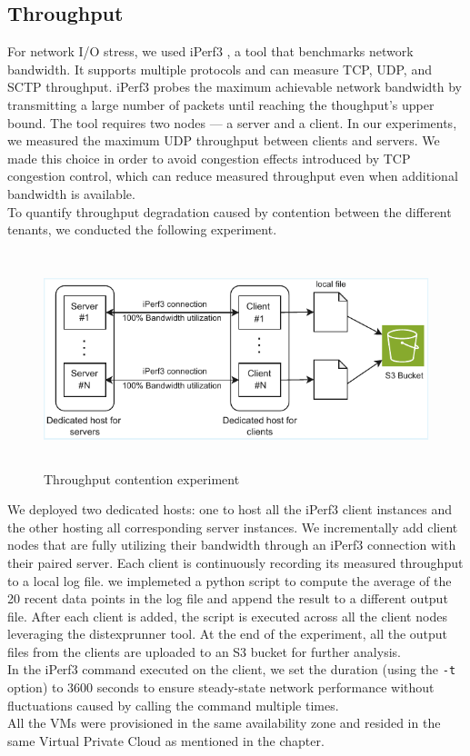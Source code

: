 \subsection{Throughput}
For network I/O stress, we used iPerf3 \cite{iperf}, a tool that benchmarks network 
bandwidth. It supports multiple protocols and can measure TCP, UDP, and SCTP 
throughput. iPerf3 probes the maximum achievable network bandwidth by transmitting a large number 
of packets until reaching the thoughput's upper bound. The tool requires two nodes — a 
server and a client. In our experiments, we measured the 
maximum UDP throughput between clients and servers. We made this choice in order to avoid congestion 
effects introduced by TCP congestion control, which can reduce measured throughput even
when additional bandwidth is available. \\
To quantify throughput degradation caused by contention between the different tenants, 
we conducted the following experiment. \\
\begin{figure}[H]
  \centering
  \includegraphics[width=14.5cm, height=6.25cm]{figures/netexp}
  \caption{Throughput contention experiment}
  \label{fig:netexp}
\end{figure}
\noindent
We deployed two dedicated hosts: one to host all the iPerf3 client instances and the other hosting all 
corresponding server instances.
We incrementally add client nodes that are fully utilizing their bandwidth 
through an iPerf3 connection with their paired server. Each client is continuously recording its measured 
throughput to a local log file. we implemeted a python script to compute the average of the 20 recent data 
points in the log file and append the result to a different output file. 
After each client is added, the script is executed across all the client nodes leveraging the distexprunner 
tool. At the end of the experiment, all the output files from the clients are uploaded to an S3 bucket 
for further analysis. \\
In the iPerf3 command executed on the client, we set the duration (using the \texttt{-t} option) 
to 3600 seconds to ensure steady-state network performance without fluctuations caused by calling 
the command multiple times. \\
All the VMs were provisioned in the same availability zone and resided
in the same Virtual Private Cloud as mentioned in the  chapter. 
